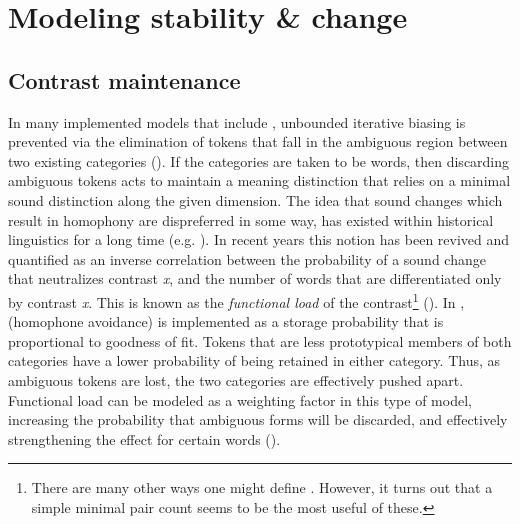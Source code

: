 \chapter{Modeling stability \& change}\label{ch:Models-of-Change}

\section{Contrast maintenance}

In many implemented  models that include , unbounded
iterative biasing is prevented via the elimination of tokens that
fall in the ambiguous region between two existing categories (\citealt{Wedel2004,Wedel2006,Wedel2008,Blevins2009,DBLP:journals/corr/Tupper14a}).
If the categories are taken to be words, then discarding ambiguous
tokens acts to maintain a meaning distinction that relies on a minimal
sound distinction along the given  dimension. The idea that
sound changes which result in homophony are dispreferred in some way, 
has existed within historical linguistics for a long time (e.g. \citealt{Martinet1955}).
In recent years this notion has been revived and quantified as an
inverse correlation between the probability of a sound change that
neutralizes contrast \emph{x}, and the number of words that are differentiated
only by contrast \emph{x}. This is known as the \emph{functional load}
of the contrast\footnote{There are many other ways one might define . However,
it turns out that a simple minimal pair count seems to be the most
useful of these.} (\citealp{Surendran2006,wedel2013high}). In \citet{Wedel2008},
 (homophone avoidance) is implemented as a storage
probability that is proportional to goodness of fit. Tokens that are
less prototypical members of both categories have a lower probability
of being retained in either category. Thus, as ambiguous tokens are
lost, the two categories are effectively pushed apart. Functional
load can be modeled as a weighting factor in this type of model, increasing
the probability that ambiguous forms will be discarded, and effectively
strengthening the  effect for certain words (\citealt{Soskuthy2015}).

